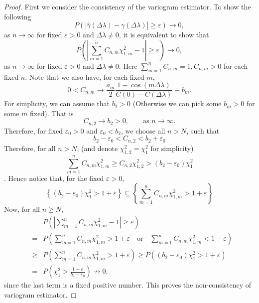 \begin{proof}
First we consider the consistency of the variogram estimator. To show the following
\[
P\left( \left|\hat{\gamma}(\Delta \lambda) - \gamma(\Delta \lambda)\right| \ge \varepsilon\right) \to 0,
\]
as $n \to \infty$ for fixed $\varepsilon > 0$ and $\Delta \lambda \ne 0$, it is equivalent to show that
\[
P\left( \left|\sum_{m = 1}^n C_{n, m} \chi_{1, m}^2 - 1 \right| \ge \varepsilon\right) \to 0,
\]
as $n \to \infty$ for fixed $\varepsilon > 0$ and $\Delta \lambda \ne 0$. Here $\sum_{m=1}^n C_{n, m} = 1, C_{n, m} > 0$ for each fixed $n$. Note that we also have, for each fixed $m$,
\[
0 < C_{n, m} \to \frac{a_m}{2}\frac{1 - \cos(m \Delta \lambda)}{C(0) - C(\Delta \lambda)} \equiv b_m.
\]
For simplicity, we can assume that $b_2 > 0$ (Otherwise we can pick some $b_m > 0$ for some $m$ fixed). That is
\[
C_{n, 2} \to b_2 > 0, \quad \quad \mbox{as $n \to \infty$}.
\]
Therefore, for fixed $\varepsilon_0 > 0$ and $\varepsilon_0 < b_2$, we choose all $n > N$, such that
\[
b_2 - \varepsilon_0 < C_{n, 2} < b_2 + \varepsilon_0
\]
Therefore, for all $n > N$, (and denote $\chi_{1, 2}^2 = \chi_1^2$ for simplicity)
\[
\sum_{m = 1}^n C_{n, m}\chi_{1,m}^2  \ge  C_{n, 2} \chi_{1, 2}^2 > (b_2 - \varepsilon_0) \chi_1^2
\]
. Hence notice that, for the fixed $\varepsilon > 0$,
\[
\left\{(b_2 - \varepsilon_0) \chi_{1}^2 > 1 + \varepsilon  \right\} \subseteq \left\{\sum_{m = 1}^n C_{n, m}\chi_{1,m}^2 > 1 + \varepsilon  \right\}
\]
Now, for all $n \ge N$,
\begin{eqnarray*}
& & P\left( \left|\sum_{m = 1}^n C_{n, m} \chi_{1, m}^2 - 1 \right| \ge \varepsilon\right) \\
&=& P\left( \sum_{m = 1}^n C_{n, m} \chi_{1, m}^2 > 1 + \varepsilon \quad \mbox{or} \quad  \sum_{m = 1}^n C_{n, m} \chi_{1, m}^2 < 1 - \varepsilon\right) \\
& \ge & P\left( \sum_{m = 1}^n C_{n, m} \chi_{1, m}^2 > 1 + \varepsilon \right)  \ge  P\left((b_2 - \varepsilon_0) \chi_{1}^2 > 1 + \varepsilon  \right) \\
& = & P\left(\chi_{1}^2 > \frac{1 + \varepsilon}{b_2 - \varepsilon_0}\right) \not\to 0,
\end{eqnarray*}
since the last term is a fixed positive number. This proves the non-consistency of variogram estimator.

\end{proof}



% 



